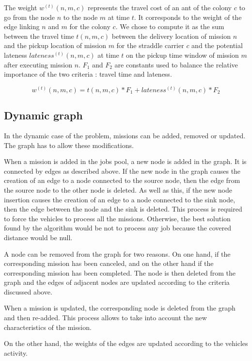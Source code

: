 \documentclass[a4paper,10pt]{article}
\begin{document}
The weight $w^{(t)}(n,m,c)$ represents the travel cost of an ant of the colony $c$ to go from the node $n$ to the node $m$ at time $t$. It corresponds to the weight of the edge linking $n$ and $m$ for the colony $c$. We chose to compute it as the sum between the travel time $t(n,m,c)$ between the delivery location of mission $n$ and the pickup location of mission $m$ for the straddle carrier $c$ and the potential lateness $lateness^{(t)}(n,m,c)$ at time $t$ on the pickup time window of mission $m$ after executing mission $n$. $F_1$ and $F_2$ are constants used to balance the relative importance of the two criteria : travel time and lateness.

\begin{equation*}
  w^{(t)}(n,m,c) = t(n,m,c)*F_1 + lateness^{(t)}(n,m,c)*F_2
\end{equation*}

\subsection{Dynamic graph}
In the dynamic case of the problem, missions can be added, removed or updated. The graph has to allow these modifications.

When a mission is added in the jobs pool, a new node is added in the graph. It is connected by edges as described above. If the new node in the graph causes the creation of an edge to a node connected to the source node, then the edge from the source node to the other node is deleted. As well as this, if the new node insertion causes the creation of an edge to a node connected to the sink node, then the edge between the node and the sink is deleted. This process is required to force the vehicles to process all the missions. Otherwise, the best solution found by the algorithm would be not to process any job because the covered distance would be null.


A node can be removed from the graph for two reasons. On one hand, if the corresponding mission has been canceled, and on the other hand if the corresponding mission has been completed. The node is then deleted from the graph and the edges of adjacent nodes are updated according to the criteria discussed above.


When a mission is updated, the corresponding node is deleted from the graph and then re-added. This process allows to take into account the new characteristics of the mission.

On the other hand, the weights of the edges are updated according to the vehicles activity.
\end{document}
